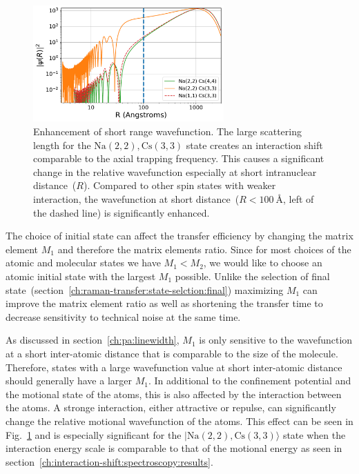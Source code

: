 \begin{figure}
  \centering
  \includegraphics[width=0.65\textwidth]{figures/raman_transfer_atomic_wavefunction.pdf}
  \caption[Enhancement of short range wavefunction]{
    Enhancement of short range wavefunction.
    The large scattering length for the $\mathrm{Na(2,2),Cs(3,3)}$ state
    creates an interaction shift comparable to the axial trapping frequency.
    This causes a significant change in the relative wavefunction especially at short
    intranuclear distance~($R$).
    Compared to other spin states with weaker interaction,
    the wavefunction at short distance~($R<100~\text{\AA}$, left of the dashed line)
    is significantly enhanced.
    \label{fig:raman-transfer:atomic-wavefunction}}
\end{figure}

The choice of initial state can affect the transfer efficiency
by changing the matrix element $M_1$ and therefore the matrix elements ratio.
Since for most choices of the atomic and molecular states we have $M_1<M_2$,
we would like to choose an atomic initial state with the largest $M_1$ possible.
Unlike the selection of final state~(section~\ref{ch:raman-transfer:state-selction:final})
maximizing $M_1$ can improve the matrix element ratio as well as
shortening the transfer time to decrease sensitivity to technical noise at the same time.

As discussed in section~\ref{ch:pa:linewidth},
$M_1$ is only sensitive to the wavefunction at a short inter-atomic distance
that is comparable to the size of the molecule.
Therefore, states with a large wavefunction value at short inter-atomic distance
should generally have a larger $M_1$.
In additional to the confinement potential and the motional state of the atoms,
this is also affected by the interaction between the atoms.
A stronge interaction, either attractive or repulse,
can significantly change the relative motional wavefunction of the atoms.
This effect can be seen in Fig.~\ref{fig:raman-transfer:atomic-wavefunction}
and is especially significant for the $|\mathrm{Na(2,2),Cs(3,3)}\rangle$ state
when the interaction energy scale is comparable to that of the motional energy
as seen in section~\ref{ch:interaction-shift:spectroscopy:results}.

